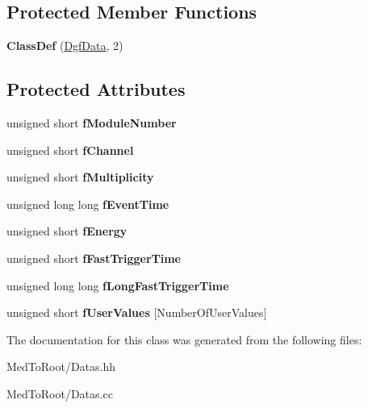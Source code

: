 \subsection*{Protected Member Functions}
\begin{DoxyCompactItemize}
\item 
\mbox{\label{class_dgf_data_a2347fc4e4a77bba56c25f979f2a9fc14}} 
{\bfseries Class\+Def} (\hyperlink{class_dgf_data}{Dgf\+Data}, 2)
\end{DoxyCompactItemize}
\subsection*{Protected Attributes}
\begin{DoxyCompactItemize}
\item 
\mbox{\label{class_dgf_data_a4d69c87a370a0451ddad97148e6f1ad5}} 
unsigned short {\bfseries f\+Module\+Number}
\item 
\mbox{\label{class_dgf_data_ab3184c2ceca7dcfe3d8374f42c6bd398}} 
unsigned short {\bfseries f\+Channel}
\item 
\mbox{\label{class_dgf_data_a34644ed74a2c8884d51b38fc49247925}} 
unsigned short {\bfseries f\+Multiplicity}
\item 
\mbox{\label{class_dgf_data_a8f7d1c87b06dbe1018b267b5410470d7}} 
unsigned long long {\bfseries f\+Event\+Time}
\item 
\mbox{\label{class_dgf_data_abab9885fd2b0bae4459f5c98d6886784}} 
unsigned short {\bfseries f\+Energy}
\item 
\mbox{\label{class_dgf_data_a9dbabd6693e7b930ee8d3900030a5a86}} 
unsigned short {\bfseries f\+Fast\+Trigger\+Time}
\item 
\mbox{\label{class_dgf_data_a1132a37b4a42fde6155f641a97ac2353}} 
unsigned long long {\bfseries f\+Long\+Fast\+Trigger\+Time}
\item 
\mbox{\label{class_dgf_data_a91de5e4d052cf02e461bf1d8021dc78e}} 
unsigned short {\bfseries f\+User\+Values} \mbox{[}Number\+Of\+User\+Values\mbox{]}
\end{DoxyCompactItemize}


The documentation for this class was generated from the following files\+:\begin{DoxyCompactItemize}
\item 
Med\+To\+Root/Datas.\+hh\item 
Med\+To\+Root/Datas.\+cc\end{DoxyCompactItemize}
